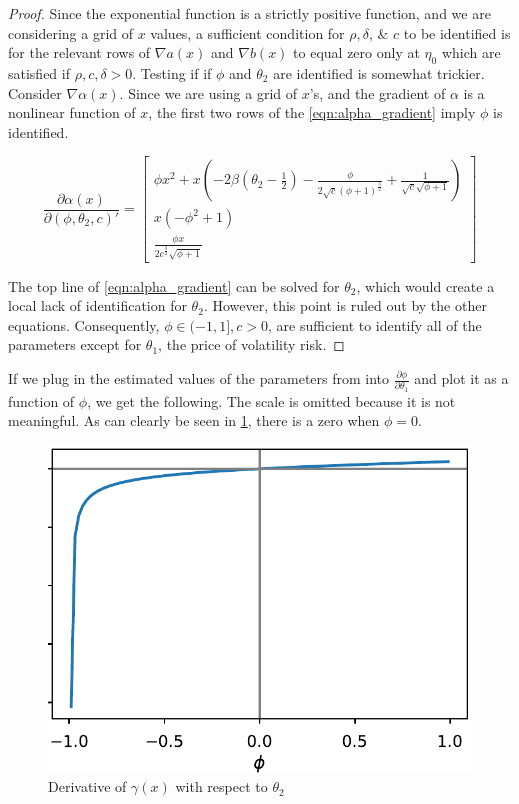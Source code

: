 \documentclass[11pt]{article}
\begin{document}
\begin{proof}

Since the exponential function is a strictly positive function, and we are considering a grid of $x$ values, a
sufficient condition for $\rho, \delta$, \& $c$ to be identified is for the relevant rows of $\nabla a(x)$ and
$\nabla b(x)$ to equal zero only at $\eta_{0}$ which are satisfied if $\rho, c, \delta > 0$.
Testing if if $\phi$ and $\theta_2$ are identified is somewhat trickier. 
Consider $\nabla \alpha(x)$. 
Since we are using a grid of $x$'s, and the gradient of $\alpha$ is a nonlinear function of $x$, the first two
rows of the \cref{eqn:alpha_gradient} imply $\phi$ is identified.

\begin{equation}
    \label{eqn:alpha_gradient}
    \frac{\partial \alpha(x)}{\partial (\phi, \theta_2, c)'}  = \begin{bmatrix} \phi x^{2} + x \left(- 2 \beta
    \left(\theta_{2} - \frac{1}{2}\right) - \frac{\phi}{2 \sqrt{c} \left(\phi + 1\right)^{\frac{3}{2}}} +
    \frac{1}{\sqrt{c} \sqrt{\phi + 1}}\right) \\ x \left(- \phi^{2} + 1\right) \\ \frac{\phi x}{2 c^{\frac{3}{2}}
    \sqrt{\phi + 1}} \end{bmatrix} 
\end{equation}

The top line of \cref{eqn:alpha_gradient} can be solved for $\theta_2$, which would create a local lack of
identification for $\theta_2$.
However, this point is ruled out by the other equations.
Consequently,  $\phi \in (-1,1], c > 0$, are sufficient to identify all of the parameters except for $\theta_1$,
the price of volatility risk.


\end{proof}

If we plug in the estimated values of the parameters from \textcite{khrapov2016affine} into $\frac{\partial
\phi}{\partial \theta_1}$ and plot it as a function of $\phi$,  we get the following.
The scale is omitted because it is not meaningful. 
As can clearly be seen in \cref{fig:fig:gamma_diff_theta2}, there is a zero when $\phi = 0$.

\begin{figure}[htb]
    \centering
    \caption{Derivative of $\gamma(x)$ with respect to $\theta_2$}
    \label{fig:fig:gamma_diff_theta2}
    \includegraphics[width=.5\textwidth]{gamma_diff_theta2.pdf}
\end{figure}
\end{document}
